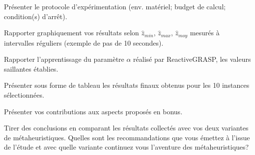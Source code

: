 \documentclass[10pt]{article}
\begin{document}
\vspace{5mm}
\noindent
{}
\vspace{2mm}

\noindent
Présenter le protocole d'expérimentation (env. matériel; budget de calcul; condition(s) d'arrêt).

\noindent
Rapporter graphiquement vos résultats selon $\hat{z}_{min}$, $\hat{z}_{max}$, $\hat{z}_{moy}$ mesurés à intervalles réguliers (exemple de pas de 10 secondes).

\noindent
Rapporter l'apprentissage du paramètre $\alpha$ réalisé par ReactiveGRASP, les valeurs saillantes établies.

\noindent
Présenter sous forme de tableau les résultats finaux obtenus pour les 10 instances sélectionnées.

%
%

\vspace{5mm}
\noindent
{}
\vspace{2mm}

\noindent
Présenter vos contributions aux aspects proposés en bonus.

%
%

\vspace{5mm}
\noindent
{}
\vspace{2mm}

\noindent
Tirer des conclusions en comparant les résultats collectés avec vos deux variantes de métaheuristiques.
\noindent
Quelles sont les recommandations que vous émettez à l'issue de l'étude et avec quelle variante continuez vous l'aventure des métaheuristiques?

\vfill
\break
\end{document}
